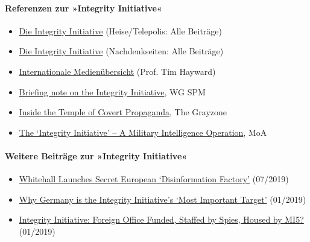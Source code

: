 \hypertarget{referenzen-zur-integrity-initiative}{%
\paragraph{Referenzen zur »Integrity
Initiative«}\label{referenzen-zur-integrity-initiative}}

\begin{itemize}
\tightlist
\item
  \href{https://www.heise.de/tp/thema/Integrity-Initiative}{Die
  Integrity Initiative} (Heise/Telepolis: Alle Beiträge)
\item
  \href{https://www.nachdenkseiten.de/?tag=integrity-initiative}{Die
  Integrity Initiative} (Nachdenkseiten: Alle Beiträge)
\item
  \href{https://timhayward.wordpress.com/2018/12/15/integrity-grasping-the-initiative}{Internationale
  Medienübersicht} (Prof. Tim Hayward)
\item
  \href{http://syriapropagandamedia.org/working-papers/briefing-note-on-the-integrity-initiative}{Briefing
  note on the Integrity Initiative}, WG SPM
\item
  \href{https://thegrayzone.com/2018/12/17/inside-the-temple-of-covert-propaganda-the-integrity-initiative-and-the-uks-scandalous-information-war/}{Inside
  the Temple of Covert Propaganda}, The Grayzone
\item
  \href{https://www.moonofalabama.org/2018/12/the-strange-mind-of-christopher-nigel-donnelly.html}{The
  `Integrity Initiative' -- A Military Intelligence Operation}, MoA
\end{itemize}

\hypertarget{weitere-beitruxe4ge-zur-integrity-initiative}{%
\paragraph{Weitere Beiträge zur »Integrity
Initiative«}\label{weitere-beitruxe4ge-zur-integrity-initiative}}

\begin{itemize}
\tightlist
\item
  \href{https://medium.com/@KitKlarenberg/integrity-initiative-in-hiding-whitehall-launches-secret-european-disinformation-factory-757bdb05cb2}{Whitehall
  Launches Secret European `Disinformation Factory'} (07/2019)
\item
  \href{https://medium.com/@KitKlarenberg/damaging-ties-why-germany-is-the-integrity-initiatives-most-important-target-10cc7d1ecb42}{Why
  Germany is the Integrity Initiative's `Most Important Target'}
  (01/2019)
\item
  \href{https://medium.com/@KitKlarenberg/integrity-initiative-foreign-office-funded-staffed-by-spies-housed-by-mi5-aca31eda86ba}{Integrity
  Initiative: Foreign Office Funded, Staffed by Spies, Housed by MI5?}
  (01/2019)
\end{itemize}

